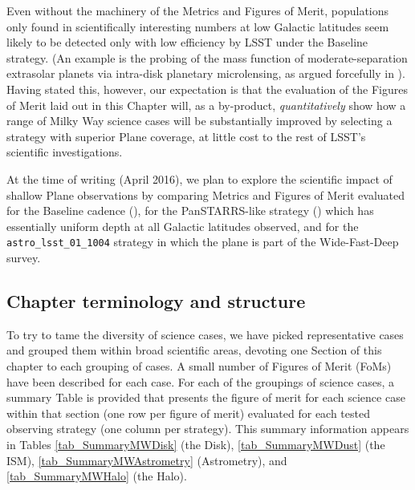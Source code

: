Even without the machinery of the Metrics and Figures of Merit,
populations only found in scientifically interesting numbers at low
Galactic latitudes seem likely to be detected only with low efficiency
by LSST under the Baseline strategy. (An example is the probing of the
mass function of moderate-separation extrasolar planets via intra-disk
planetary microlensing, as argued forcefully in \citet{gould13}). Having
stated this, however, our expectation is that the evaluation of the
Figures of Merit laid out in this Chapter will, as a by-product, {\it
quantitatively} show how a range of Milky Way science cases will be
substantially improved by selecting a strategy with superior Plane
coverage, at little cost to the rest of LSST's scientific
investigations.

At the time of writing (April 2016), we plan to explore the scientific
impact of shallow Plane observations by comparing Metrics and Figures of
Merit evaluated for the Baseline cadence (),
for the PanSTARRS-like strategy () which has
essentially uniform depth at all Galactic latitudes observed, and for
the {\tt astro\_lsst\_01\_1004} strategy in which the plane is part of
the Wide-Fast-Deep survey.


\subsection{Chapter terminology and structure}

To try to tame the diversity of science cases, we have picked
representative cases and grouped them within broad scientific areas,
devoting one Section of this chapter to each grouping of cases. A small
number of Figures of Merit (FoMs) have been described for each case. For
each of the groupings of science cases, a summary Table is provided that
presents the figure of merit for each science case within that section
(one row per figure of merit) evaluated for each tested observing
strategy (one column per strategy). This summary information appears in
Tables \ref{tab_SummaryMWDisk} (the Disk), \ref{tab_SummaryMWDust} (the
ISM), \ref{tab_SummaryMWAstrometry} (Astrometry), and
\ref{tab_SummaryMWHalo} (the Halo).

